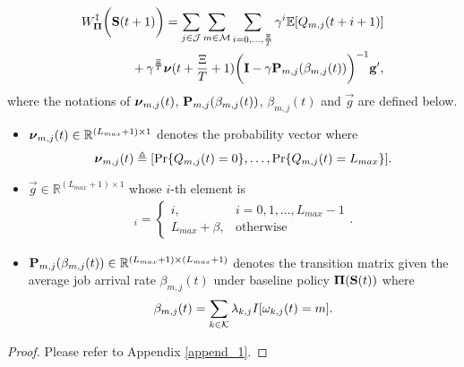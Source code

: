 \begin{lemma}
    {\small
    \begin{align}
        &W^{\ddagger}_{\boldsymbol{\Pi}}\bigg(\mathbf{S}(t+1)\bigg)
        = \sum_{j\in\mathcal{J}}\sum_{m\in\mathcal{M}}\sum_{i=0,\dots,\frac{\Xi}{T}} \gamma^{i} \mathbb{E}[ Q_{m,j}({t+i+1}) ]
        \nonumber\\
        &~~~~~~~~~~~~+ \gamma^{\frac{\Xi}{T}} 
        \boldsymbol{\nu}({t+\frac{\Xi}{T}+1})
        \bigg(
            \mathbf{I} - \gamma \mathbf{P}_{m,j}(\beta_{m,j}(t))
        \bigg)^{-1} \mathbf{g}',
        \label{w_es}
    \end{align}   
    }
    where the notations of $\boldsymbol{\nu}_{m,j}(t)$, $\mathbf{P}_{m,j}(\beta_{m,j}(t))$, $\beta_{m,j}(t)$ and $\vec{g}$ are defined below.
    \begin{itemize}
        \item $\boldsymbol{\nu}_{m,j}(t) \in \mathbb{R}^{(L_{max}+1) \times 1}$ denotes the probability vector where
        \begin{align}
            \boldsymbol{\nu}_{m,j}(t) \triangleq [\Pr\{Q_{m,j}(t)=0\}, \dots, \Pr\{Q_{m,j}(t)=L_{max}\}].
        \end{align}

        \item $\vec{g} \in \mathbb{R}^{(L_{max}+1) \times 1}$ whose $i$-th element is
        \begin{align}
            [\vec{g}]_{i} = 
            \begin{cases}
                i, & i=0,1,\dots,L_{max}-1
                \\
                L_{max}+\beta, & \text{otherwise}
            \end{cases}.
        \end{align}

        \item $\mathbf{P}_{m,j}(\beta_{m,j}(t)) \in \mathbb{R}^{(L_{max}+1) \times (L_{max}+1)}$ denotes the transition matrix given the average job arrival rate $\beta_{m,j}(t)$ under baseline policy $\boldsymbol{\Pi}(\mathbf{S}(t))$ where
        \begin{align}
            \beta_{m,j}(t) = \sum_{k\in\mathcal{K}} \lambda_{k,j} I[\omega_{k,j}(t)=m].
        \end{align}
    \end{itemize}

\end{lemma}
\begin{proof}
    Please refer to Appendix \ref{append_1}.
\end{proof}

